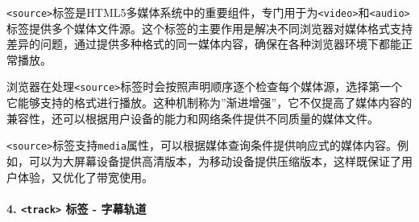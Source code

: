 \texttt{\textless{}source\textgreater{}}标签是HTML5多媒体系统中的重要组件，专门用于为\texttt{\textless{}video\textgreater{}}和\texttt{\textless{}audio\textgreater{}}标签提供多个媒体文件源。这个标签的主要作用是解决不同浏览器对媒体格式支持差异的问题，通过提供多种格式的同一媒体内容，确保在各种浏览器环境下都能正常播放。

浏览器在处理\texttt{\textless{}source\textgreater{}}标签时会按照声明顺序逐个检查每个媒体源，选择第一个它能够支持的格式进行播放。这种机制称为''渐进增强''，它不仅提高了媒体内容的兼容性，还可以根据用户设备的能力和网络条件提供不同质量的媒体文件。

\texttt{\textless{}source\textgreater{}}标签支持\texttt{media}属性，可以根据媒体查询条件提供响应式的媒体内容。例如，可以为大屏幕设备提供高清版本，为移动设备提供压缩版本，这样既保证了用户体验，又优化了带宽使用。

\begin{Shaded}
\begin{Highlighting}[]
\DataTypeTok{\textless{}}\DataTypeTok{\textgreater{}}
    \DataTypeTok{\textless{}}\OperatorTok{=}\OperatorTok{=}\OperatorTok{=}\DataTypeTok{\textgreater{}}
    \DataTypeTok{\textless{}}\OperatorTok{=}\OperatorTok{=}\OperatorTok{=}\DataTypeTok{\textgreater{}}
    \DataTypeTok{\textless{}}\OperatorTok{=}\OperatorTok{=}\DataTypeTok{\textgreater{}}
    \DataTypeTok{\textless{}}\OperatorTok{=}\OperatorTok{=}\DataTypeTok{\textgreater{}}
\DataTypeTok{\textless{}/}\DataTypeTok{\textgreater{}}
\end{Highlighting}
\end{Shaded}

\paragraph{\texorpdfstring{4. \texttt{\textless{}track\textgreater{}} 标签 - 字幕轨道}{4. \textless track\textgreater{} 标签 - 字幕轨道}}\label{track-ux6807ux7b7e---ux5b57ux5e55ux8f68ux9053}

